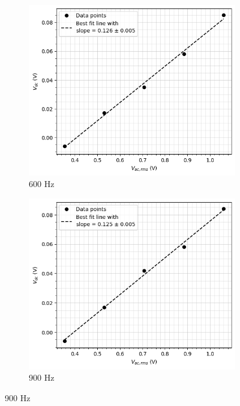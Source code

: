 \begin{figure}[H]
    \begin{subfigure}{\linewidth}
    \includegraphics[width=1\textwidth]{images/c2.png}
    \caption{600 Hz}
    \end{subfigure} 
    \bigskip
    \begin{subfigure}{\linewidth}
    \includegraphics[width=\textwidth]{images/c3.png}
    \caption{900 Hz}
    \end{subfigure}
   
    \end{figure}
    
